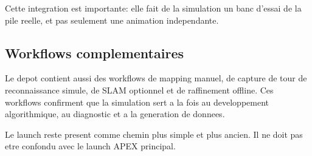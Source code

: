 Cette integration est importante: elle fait de la simulation un banc d'essai de la pile reelle, et pas seulement une animation independante.

\subsection{Workflows complementaires}

Le depot contient aussi des workflows de mapping manuel, de capture de tour de reconnaissance simule, de SLAM optionnel et de raffinement offline. Ces workflows confirment que la simulation sert a la fois au developpement algorithmique, au diagnostic et a la generation de donnees.

Le launch  reste present comme chemin plus simple et plus ancien. Il ne doit pas etre confondu avec le launch APEX principal.

